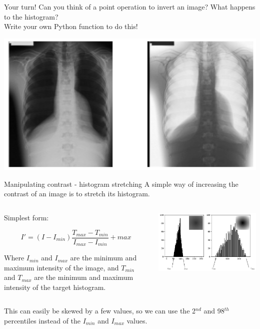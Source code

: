\documentclass[9pt, aspectratio=169]{beamer}
\begin{document}
\begin{frame}
    {Your turn!}
    Can you think of a point operation to invert an image? What happens to the histogram?\\Write your own Python function to do this!

    \centering
    \includegraphics[width=.8\textwidth]{invert_image.png}

\end{frame}
\begin{frame}{Manipulating contrast - histogram stretching}
    A simple way of increasing the contrast of an image is to stretch its histogram.

    \begin{columns}
        \begin{column}{.4\textwidth}
            Simplest form:

            $$I' = (I - I_{min}) \frac{T_{max}-T_{min}}{I_{max}-I_{min}} + max$$

            Where $I_{min}$ and $I_{max}$ are the minimum and maximum intensity of the image, and $T_{min}$ and $T_{max}$ are the minimum and maximum intensity of the target histogram.
        \end{column}
        \begin{column}{.6\textwidth}
            \centering
            \includegraphics[width=\textwidth]{histo_stretching_example.png}
        \end{column}    
    \end{columns}
    This can easily be skewed by a few values, so we can use the 2$^{nd}$ and 98$^{th}$ percentiles instead of the $I_{min}$ and $I_{max}$ values.
\end{frame}
\end{document}
